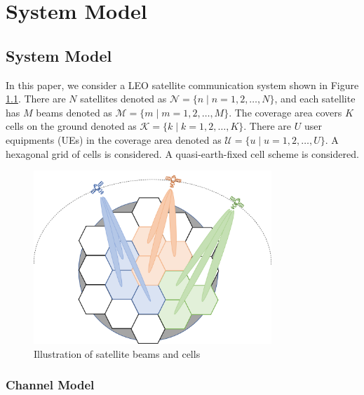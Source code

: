 \chapter{System Model}
\label{chap:model}


\section{System Model}

In this paper, we consider a LEO satellite communication system shown in Figure \ref{fig_sat}. There are $N$ satellites denoted as $\mathcal{N} = \{n \mid n = 1, 2, \ldots, N\}$, and each satellite has $M$ beams denoted as $\mathcal{M} = \{m \mid m = 1, 2, \ldots, M\}$. The coverage area covers $K$ cells on the ground denoted as $\mathcal{K} = \{k \mid k = 1, 2, \ldots, K\}$. There are $U$ user equipments (UEs) in the coverage area denoted as $\mathcal{U} = \{u \mid u = 1, 2, \ldots, U\}$. A hexagonal grid of cells is considered. A quasi-earth-fixed cell scheme is considered.

\begin{figure}[h!]
    \centering
    \includegraphics[width=0.8\textwidth]{satellites_cells.png}
    \caption{Illustration of satellite beams and cells}
    \label{fig_sat}
\end{figure}

\subsection{Channel Model}

